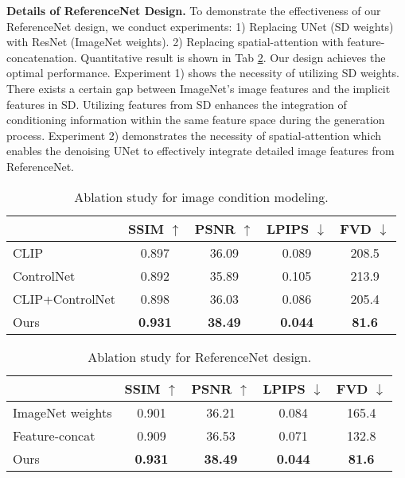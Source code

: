 \noindent
\textbf{Details of ReferenceNet Design. }
To demonstrate the effectiveness of our ReferenceNet design, we conduct experiments: 1) Replacing UNet (SD weights) with ResNet (ImageNet weights). 2) Replacing spatial-attention with feature-concatenation. Quantitative result is shown in Tab \ref{table:ablation_rebuttal}. Our design achieves the optimal performance. Experiment 1) shows the necessity of utilizing SD weights. There exists a certain gap between ImageNet's image features and the implicit features in SD. Utilizing features from SD enhances the integration of conditioning information within the same feature space during the generation process. Experiment 2) demonstrates the necessity of spatial-attention which enables the denoising UNet to effectively integrate detailed image features from ReferenceNet. 

\begin{table}
    \setlength{\tabcolsep}{4pt}
	\centering
\begin{center}
\begin{tabular}{lcccc} 

\hline
    & SSIM $\uparrow$ & PSNR $\uparrow$ & LPIPS $\downarrow$  & FVD $\downarrow$ \\
 \hline
 CLIP     & 0.897 & 36.09 & 0.089    & 208.5 \\
 ControlNet    & 0.892 & 35.89 & 0.105  & 213.9 \\
CLIP+ControlNet & 0.898 & 36.03 & 0.086  & 205.4 \\
Ours & \textbf{0.931} & \textbf{38.49} & \textbf{0.044}  & \textbf{81.6} \\
 
\hline
\end{tabular}
\end{center}    \vspace{-0.5cm}
	\caption{Ablation study for image condition modeling.}
    \vspace{-0.3cm}
	\label{table:ablation}
\end{table}

\begin{table}
    \setlength{\tabcolsep}{4pt}
	\centering
\begin{center}
\begin{tabular}{lcccc} 

\hline
    & SSIM $\uparrow$ & PSNR $\uparrow$ & LPIPS $\downarrow$  & FVD $\downarrow$ \\
 \hline
 ImageNet weights     & 0.901 & 36.21 & 0.084    & 165.4 \\
 Feature-concat    & 0.909 & 36.53 & 0.071  & 132.8 \\
Ours & \textbf{0.931} & \textbf{38.49} & \textbf{0.044}  & \textbf{81.6} \\
 
\hline
\end{tabular}
\end{center}    \vspace{-0.5cm}
	\caption{Ablation study for ReferenceNet design.}
    \vspace{-0.3cm}
	\label{table:ablation_rebuttal}
\end{table}

